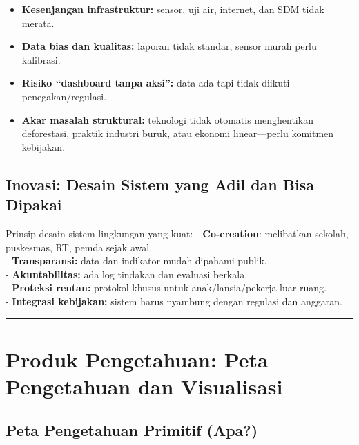 \documentclass[
  letterpaper,
  DIV=11,
  numbers=noendperiod]{scrreprt}
\providecommand{\tightlist}{%
  \setlength{\itemsep}{0pt}\setlength{\parskip}{0pt}}
\begin{document}
\begin{itemize}
\tightlist
\item
  \textbf{Kesenjangan infrastruktur:} sensor, uji air, internet, dan SDM
  tidak merata.\\
\item
  \textbf{Data bias dan kualitas:} laporan tidak standar, sensor murah
  perlu kalibrasi.\\
\item
  \textbf{Risiko ``dashboard tanpa aksi'':} data ada tapi tidak diikuti
  penegakan/regulasi.\\
\item
  \textbf{Akar masalah struktural:} teknologi tidak otomatis
  menghentikan deforestasi, praktik industri buruk, atau ekonomi
  linear---perlu komitmen kebijakan.
\end{itemize}

\subsection{Inovasi: Desain Sistem yang Adil dan Bisa
Dipakai}\label{inovasi-desain-sistem-yang-adil-dan-bisa-dipakai}

Prinsip desain sistem lingkungan yang kuat: - \textbf{Co-creation}:
melibatkan sekolah, puskesmas, RT, pemda sejak awal.\\
- \textbf{Transparansi:} data dan indikator mudah dipahami publik.\\
- \textbf{Akuntabilitas:} ada log tindakan dan evaluasi berkala.\\
- \textbf{Proteksi rentan:} protokol khusus untuk anak/lansia/pekerja
luar ruang.\\
- \textbf{Integrasi kebijakan:} sistem harus nyambung dengan regulasi
dan anggaran.

\begin{center}\rule{0.5\linewidth}{0.5pt}\end{center}

\section{Produk Pengetahuan: Peta Pengetahuan dan
Visualisasi}\label{produk-pengetahuan-peta-pengetahuan-dan-visualisasi}

\subsection{Peta Pengetahuan Primitif
(Apa?)}\label{peta-pengetahuan-primitif-apa}
\end{document}
